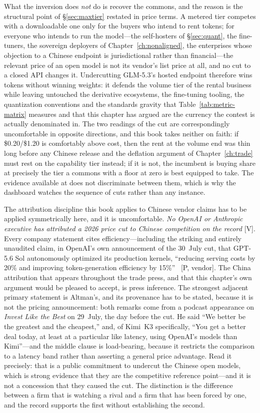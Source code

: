 What the inversion does \emph{not} do is recover the commons, and the reason is the structural point of \S\ref{sec:maxtier} restated in price terms. A metered tier competes with a downloadable one only for the buyers who intend to rent tokens; for everyone who intends to run the model---the self-hosters of \S\ref{sec:quant}, the fine-tuners, the sovereign deployers of Chapter~\ref{ch:nonaligned}, the enterprises whose objection to a Chinese endpoint is jurisdictional rather than financial---the relevant price of an open model is not its vendor's list price at all, and no cut to a closed API changes it. Undercutting GLM-5.3's hosted endpoint therefore wins tokens without winning weights: it defends the volume tier of the rental business while leaving untouched the derivative ecosystems, the fine-tuning tooling, the quantization conventions and the standards gravity that Table~\ref{tab:metric-matrix} measures and that this chapter has argued are the currency the contest is actually denominated in. The two readings of the cut are correspondingly uncomfortable in opposite directions, and this book takes neither on faith: if \$0.20/\$1.20 is comfortably above cost, then the rent at the volume end was thin long before any Chinese release and the deflation argument of Chapter~\ref{ch:trade} must rest on the capability tier instead; if it is not, the incumbent is buying share at precisely the tier a commons with a floor at zero is best equipped to take. The evidence available at \datafreeze does not discriminate between them, which is why the dashboard watches the sequence of cuts rather than any instance.

The attribution discipline this book applies to Chinese vendor claims has to be applied symmetrically here, and it is uncomfortable. \emph{No OpenAI or Anthropic executive has attributed a 2026 price cut to Chinese competition on the record} [V]. Every company statement cites efficiency---including the striking and entirely unaudited claim, in OpenAI's own announcement of the 30~July cut, that GPT-5.6 Sol autonomously optimized its production kernels, ``reducing serving costs by 20\% and improving token-generation efficiency by 15\%''~\cite{openai-luna} [P, vendor]. The China attribution that appears throughout the trade press, and that this chapter's own argument would be pleased to accept, is press inference. The strongest adjacent primary statement is Altman's, and its provenance has to be stated, because it is not the pricing announcement: both remarks come from a podcast appearance on \emph{Invest Like the Best} on 29~July, the day before the cut. He said ``We better be the greatest and the cheapest,'' and, of Kimi~K3 specifically, ``You get a better deal today, at least at a particular like latency, using OpenAI's models than Kimi''---and the middle clause is load-bearing, because it restricts the comparison to a latency band rather than asserting a general price advantage. Read it precisely: that is a public commitment to undercut the Chinese open models, which is strong evidence that they are the competitive reference point---and it is not a concession that they caused the cut. The distinction is the difference between a firm that is watching a rival and a firm that has been forced by one, and the record supports the first without establishing the second.


